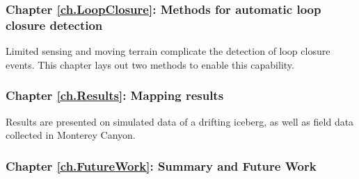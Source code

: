 \subsubsection*{Chapter \ref{ch.LoopClosure}: Methods for automatic loop closure detection} Limited sensing and moving terrain complicate the detection of loop closure events. This chapter lays out two methods to enable this capability.

\subsubsection*{Chapter \ref{ch.Results}: Mapping results} Results are presented on simulated data of a drifting iceberg, as well as field data collected in Monterey Canyon. 

\subsubsection*{Chapter \ref{ch.FutureWork}: Summary and Future Work}

